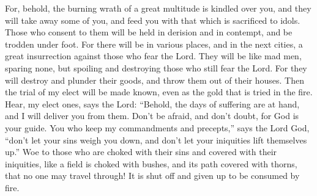  For, behold, the burning wrath of a great multitude is
kindled over you, and they will take away some of you, and feed you with
that which is sacrificed to idols.  Those who consent to
them will be held in derision and in contempt, and be trodden under
foot.  For there will be in various places, and in the
next cities, a great insurrection against those who fear the Lord.
 They will be like mad men, sparing none, but spoiling
and destroying those who still fear the Lord.  For they
will destroy and plunder their goods, and throw them out of their
houses.  Then the trial of my elect will be made known,
even as the gold that is tried in the fire.  Hear, my
elect ones, says the Lord: ``Behold, the days of suffering are at hand,
and I will deliver you from them.  Don't be afraid, and
don't doubt, for God is your guide.  You who keep my
commandments and precepts,'' says the Lord God, ``don't let your sins
weigh you down, and don't let your iniquities lift themselves up.''
 Woe to those who are choked with their sins and covered
with their iniquities, like a field is choked with bushes, and its path
covered with thorns, that no one may travel through!  It
is shut off and given up to be consumed by fire.
